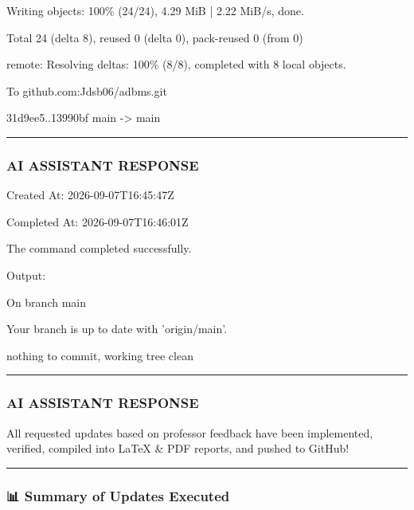 \documentclass[11pt,a4paper]{article}
\begin{document}
Writing objects: 100\% (24/24), 4.29 MiB | 2.22 MiB/s, done.

Total 24 (delta 8), reused 0 (delta 0), pack-reused 0 (from 0)

remote: Resolving deltas: 100\% (8/8), completed with 8 local objects.

To github.com:Jdsb06/adbms.git

31d9ee5..13990bf  main -> main


\hrule

\subsubsection{AI ASSISTANT RESPONSE}

Created At: 2026-09-07T16:45:47Z

Completed At: 2026-09-07T16:46:01Z


The command completed successfully.

Output:

On branch main

Your branch is up to date with 'origin/main'.


nothing to commit, working tree clean


\hrule

\subsubsection{AI ASSISTANT RESPONSE}

All requested updates based on professor feedback have been implemented, verified, compiled into LaTeX \& PDF reports, and pushed to GitHub!


\hrule


\subsubsection{📊 Summary of Updates Executed}
\end{document}
